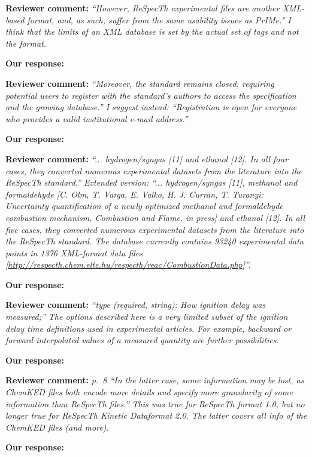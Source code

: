 \documentclass[a4paper,10pt]{elsarticle}
\begin{document}
\textbf{Reviewer comment:}
\textit{``However, ReSpecTh experimental files are another XML-based format, and, as such, suffer from the same usability issues as PrIMe.''
I think that the limits of an XML database is set by the actual set of tags and not the format.
}

\textbf{Our response:}



\textbf{Reviewer comment:}
\textit{``Moreover, the standard remains closed, requiring potential users to register with the standard's authors to access the specification and the growing database.''
I suggest instead:
``Registration is open for everyone who provides a valid institutional e-mail address.''
}

\textbf{Our response:}


\textbf{Reviewer comment:}
\textit{
``... hydrogen/syngas [11] and ethanol [12]. In all four cases, they converted numerous experimental datasets from the literature into the ReSpecTh standard.''
Extended version:
``... hydrogen/syngas [11], methanol and formaldehyde [C. Olm, T. Varga, E. Valko, H. J. Curran, T. Turanyi: Uncertainty quantification of a newly optimized methanol and formaldehyde combustion mechanism, Combustion and Flame, in press] and ethanol [12]. In all five cases, they converted numerous experimental datasets from the literature into the ReSpecTh standard. The database currently contains  93240 experimental data points in 1376 XML-format data files [\url{http://respecth.chem.elte.hu/respecth/reac/CombustionData.php}]''.
}

\textbf{Our response:}



\textbf{Reviewer comment:}
\textit{``type (required, string): How ignition delay was measured;''
The options described here is a very limited subset of the ignition delay time definitions used in experimental articles. For example, backward or forward interpolated values of a measured quantity are further possibilities.
}

\textbf{Our response:}


\textbf{Reviewer comment:}
\textit{p.~8 ``In the latter case, some information may be lost, as ChemKED files both encode more details and specify more granularity of some information than ReSpecTh files.''
This was true for ReSpecTh format 1.0, but no longer true for ReSpecTh Kinetic Dataformat 2.0. The latter covers all info of the ChemKED files (and more).
}

\textbf{Our response:}
\end{document}
